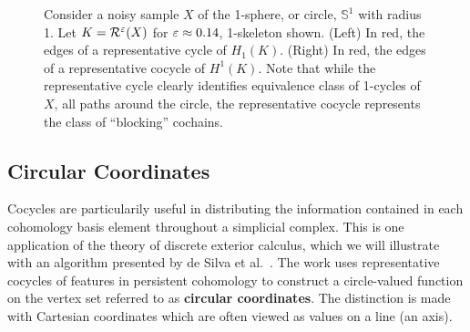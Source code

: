 \begin{figure}[htbp]
    \caption{Consider a noisy sample $X$ of the 1-sphere, or circle, $\mathbb{S}^1$ with radius 1.
            Let $K = \mathcal{R}^\varepsilon(X)$ for $\varepsilon\approx 0.14$, 1-skeleton shown.
            (Left) In red, the edges of a representative cycle of $H_1(K)$.
            (Right) In red, the edges of a representative cocycle of $H^1(K)$.
            Note that while the representative cycle clearly identifies equivalence class of 1-cycles of $X$, all paths around the circle, the representative cocycle represents the class of ``blocking'' cochains.}
    \label{fig:cycles}
\end{figure}

\subsection{Circular Coordinates}

Cocycles are particularily useful in distributing the information contained in each cohomology basis element throughout a simplicial complex.
This is one application of the theory of discrete exterior calculus, which we will illustrate with an algorithm presented by de Silva et al.~\cite{desilva09persistent}.
The work uses representative cocycles of features in persistent cohomology to construct a circle-valued function on the vertex set referred to as \textbf{circular coordinates}.
The distinction is made with Cartesian coordinates which are often viewed as values on a line (an axis).

